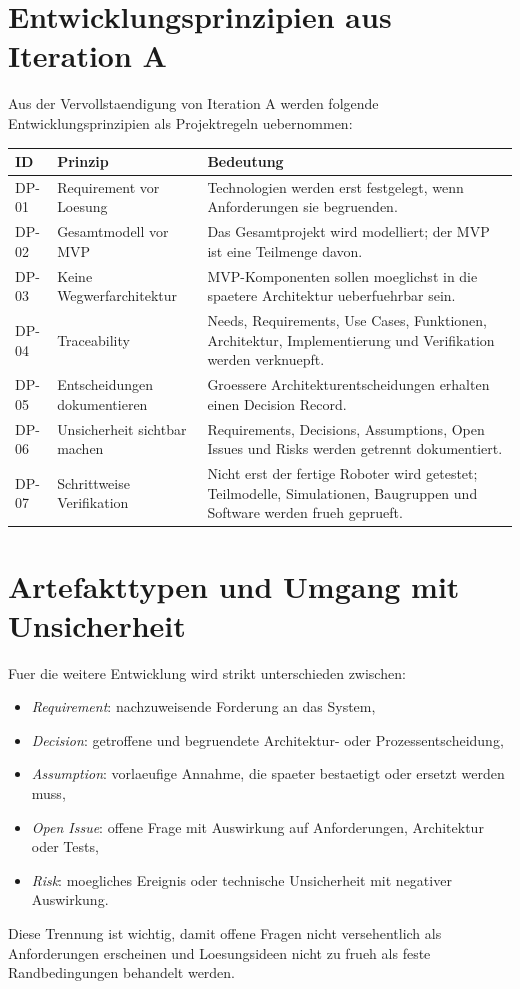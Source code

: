 \section{Entwicklungsprinzipien aus Iteration A}

Aus der Vervollstaendigung von Iteration A werden folgende Entwicklungsprinzipien als Projektregeln uebernommen:

\begin{longtable}{L{0.14\textwidth} L{0.28\textwidth} L{0.44\textwidth}}
\toprule
ID & Prinzip & Bedeutung \\
\midrule
DP-01 & Requirement vor Loesung & Technologien werden erst festgelegt, wenn Anforderungen sie begruenden. \\
DP-02 & Gesamtmodell vor MVP & Das Gesamtprojekt wird modelliert; der MVP ist eine Teilmenge davon. \\
DP-03 & Keine Wegwerfarchitektur & MVP-Komponenten sollen moeglichst in die spaetere Architektur ueberfuehrbar sein. \\
DP-04 & Traceability & Needs, Requirements, Use Cases, Funktionen, Architektur, Implementierung und Verifikation werden verknuepft. \\
DP-05 & Entscheidungen dokumentieren & Groessere Architekturentscheidungen erhalten einen Decision Record. \\
DP-06 & Unsicherheit sichtbar machen & Requirements, Decisions, Assumptions, Open Issues und Risks werden getrennt dokumentiert. \\
DP-07 & Schrittweise Verifikation & Nicht erst der fertige Roboter wird getestet; Teilmodelle, Simulationen, Baugruppen und Software werden frueh geprueft. \\
\bottomrule
\end{longtable}

\section{Artefakttypen und Umgang mit Unsicherheit}

Fuer die weitere Entwicklung wird strikt unterschieden zwischen:
\begin{itemize}
  \item \emph{Requirement}: nachzuweisende Forderung an das System,
  \item \emph{Decision}: getroffene und begruendete Architektur- oder Prozessentscheidung,
  \item \emph{Assumption}: vorlaeufige Annahme, die spaeter bestaetigt oder ersetzt werden muss,
  \item \emph{Open Issue}: offene Frage mit Auswirkung auf Anforderungen, Architektur oder Tests,
  \item \emph{Risk}: moegliches Ereignis oder technische Unsicherheit mit negativer Auswirkung.
\end{itemize}

Diese Trennung ist wichtig, damit offene Fragen nicht versehentlich als Anforderungen erscheinen und Loesungsideen nicht zu frueh als feste Randbedingungen behandelt werden.
